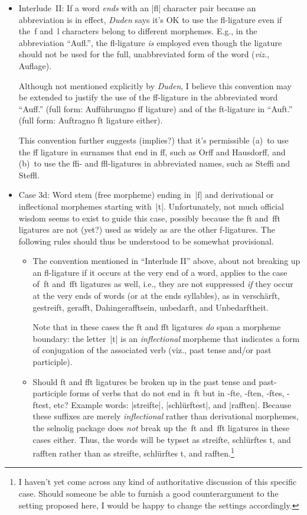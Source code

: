 \documentclass[11pt]{article}
\newcommand{\pkg}[1]{\textsf{#1}}
\begin{document}
\begin{itemize}
\begin{itemize}
\item Interlude~II: If a word \emph{ends} with an |fl| character pair because an abbreviation is in effect, \emph{Duden} says it's OK to use the fl-ligature even if the~f and~l characters belong to different morphemes. E.g., in the abbreviation \enquote{Aufl.}, the fl-ligature \emph{is} employed even though the ligature should not be used for the full, unabbreviated form of the word (\emph{viz.}, Auflage).

Although not mentioned explicitly by \emph{Duden}, I believe this convention may be extended to justify the use of the ff-ligature in the abbreviated word \enquote{Auff.} (full form: Aufführung\textemdash no ff ligature) and of the ft-ligature in \enquote{Auft.} (full form: Auftrag\textemdash no ft ligature either).

This convention further suggests (implies?) that it's permissible (a)~to use the ff ligature in surnames that end in ff, such as Orff and Hausdorff, and (b)~to use the ffi- and ffl-ligatures in abbreviated names, such as Steffi and Steffl. 

\item Case 3d: Word stem (free morpheme) ending in~|f| and derivational or inflectional morphemes starting with~|t|. Unfortunately, not much official wisdom seems to exist to guide this case, possibly because the ft and~fft ligatures are not (yet?) used as widely as are the other f-ligatures. The following rules should thus be understood to be somewhat provisional.

\begin{itemize}
\item The convention mentioned in \enquote{Interlude II} above, about not breaking up an fl-ligature if it occurs at the very end of a word, applies to the case of~ft and~fft ligatures as well, i.e., they are not suppressed \emph{if} they occur at the very ends of words (or at the ends syllables), as in verschärft, gestreift, gerafft, Dahingerafftsein, unbedarft, and Unbedarftheit. 

Note that in these cases the ft and fft ligatures \emph{do} span a morpheme boundary: the letter~|t| is an \emph{inflectional} morpheme that indicates a form of conjugation of the associated verb (viz., past tense and/or past participle).

\item Should ft and fft ligatures be broken up in the past tense and past-participle forms of verbs that do not end in~ft but in -fte, -ften, -ftes, -ftest, etc? Example words: |streifte|, |schlürftest|, and |rafften|. Because these suffixes are merely \emph{inflectional} rather than derivational morphemes, the \pkg{selnolig} package does \emph{not} break up the~ft and~fft ligatures in these cases either. Thus, the words will be typset as streifte, schlürftes\kern0pt t, and rafften rather than as streif\breaklig te, schlürf\breaklig tes\kern0pt t, and raff\breaklig ten.\footnote{I haven't yet come across any kind of authoritative discussion of this specific case. Should someone be able to furnish a good counterargument to the setting proposed here, I would be happy to change the settings accordingly.}


\end{itemize}
\end{itemize}
\end{itemize}
\end{document}
